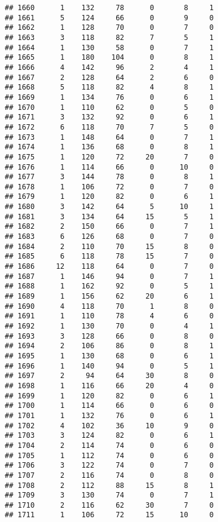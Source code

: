\documentclass[
]{article}
\begin{document}
\begin{verbatim}
## 1660      1    132     78      0       8     1
## 1661      5    124     66      0       9     0
## 1662      1    128     70      0       7     0
## 1663      3    118     82      7       5     1
## 1664      1    130     58      0       7     1
## 1665      1    180    104      0       8     1
## 1666      4    142     96      2       4     1
## 1667      2    128     64      2       6     0
## 1668      5    118     82      4       8     1
## 1669      1    134     76      0       6     1
## 1670      1    110     62      0       5     0
## 1671      3    132     92      0       6     1
## 1672      6    118     70      7       5     0
## 1673      1    148     64      0       7     1
## 1674      1    136     68      0       8     1
## 1675      1    120     72     20       7     0
## 1676      1    114     66      0      10     0
## 1677      3    144     78      0       8     1
## 1678      1    106     72      0       7     0
## 1679      1    120     82      0       6     1
## 1680      3    142     64      5      10     1
## 1681      3    134     64     15       5     1
## 1682      2    150     66      0       7     1
## 1683      6    126     68      0       7     0
## 1684      2    110     70     15       8     0
## 1685      6    118     78     15       7     0
## 1686     12    118     64      0       7     0
## 1687      1    146     94      0       7     1
## 1688      1    162     92      0       5     1
## 1689      1    156     62     20       6     1
## 1690      4    118     70      1       8     0
## 1691      1    110     78      4       6     0
## 1692      1    130     70      0       4     1
## 1693      3    128     66      0       8     0
## 1694      2    106     86      0       8     1
## 1695      1    130     68      0       6     1
## 1696      1    140     94      0       5     1
## 1697      2     94     64     30       8     0
## 1698      1    116     66     20       4     0
## 1699      1    120     82      0       6     1
## 1700      1    114     66      0       6     0
## 1701      1    132     76      0       6     1
## 1702      4    102     36     10       9     0
## 1703      3    124     82      0       6     1
## 1704      2    114     74      0       6     0
## 1705      1    112     74      0       6     0
## 1706      3    122     74      0       7     0
## 1707      2    116     74      0       8     0
## 1708      2    112     88     15       8     1
## 1709      3    130     74      0       7     1
## 1710      2    116     62     30       7     0
## 1711      1    106     72     15      10     0

\end{verbatim}
\end{document}
